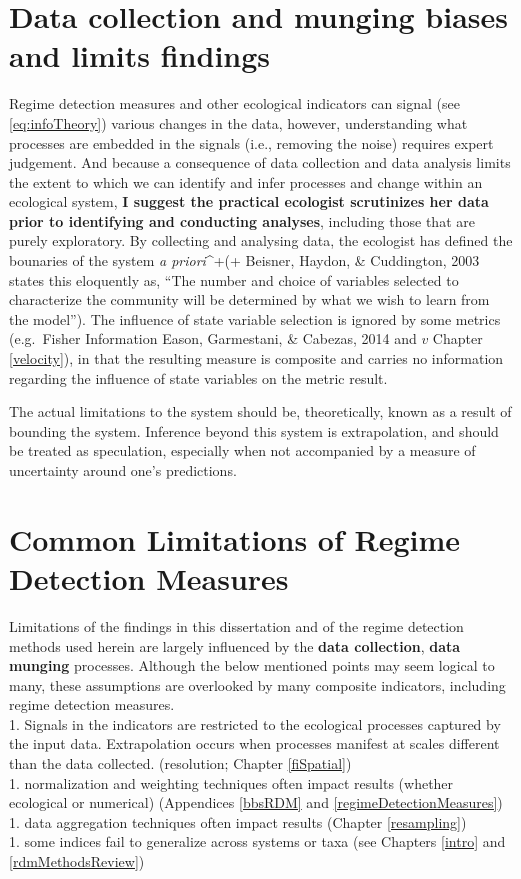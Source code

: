 \documentclass[12pt,twoside,openany]{reedthesis}
\begin{document}
\section{Data collection and munging biases and limits
findings}\label{data-collection-and-munging-biases-and-limits-findings}

Regime detection measures and other ecological indicators can signal
(see \eqref{eq:infoTheory}) various changes in the data, however,
understanding what processes are embedded in the signals (i.e., removing
the noise) requires expert judgement. And because a consequence of data
collection and data analysis limits the extent to which we can identify
and infer processes and change within an ecological system, \textbf{I
suggest the practical ecologist scrutinizes her data prior to
identifying and conducting analyses}, including those that are purely
exploratory. By collecting and analysing data, the ecologist has defined
the bounaries of the system \emph{a priori}\^{}+(+ Beisner, Haydon, \&
Cuddington, 2003 states this eloquently as, ``The number and choice of
variables selected to characterize the community will be determined by
what we wish to learn from the model''). The influence of state variable
selection is ignored by some metrics (e.g.~Fisher Information Eason,
Garmestani, \& Cabezas, 2014 and \(v\) Chapter \ref{velocity}), in that
the resulting measure is composite and carries no information regarding
the influence of state variables on the metric result.

The actual limitations to the system should be, theoretically, known as
a result of bounding the system. Inference beyond this system is
extrapolation, and should be treated as speculation, especially when not
accompanied by a measure of uncertainty around one's predictions.

\section{Common Limitations of Regime Detection
Measures}\label{common-limitations-of-regime-detection-measures}

Limitations of the findings in this dissertation and of the regime
detection methods used herein are largely influenced by the \textbf{data
collection}, \textbf{data munging} processes. Although the below
mentioned points may seem logical to many, these assumptions are
overlooked by many composite indicators, including regime detection
measures.\\
1. Signals in the indicators are restricted to the ecological processes
captured by the input data. Extrapolation occurs when processes manifest
at scales different than the data collected. (resolution; Chapter
\ref{fiSpatial})\\
1. normalization and weighting techniques often impact results (whether
ecological or numerical) (Appendices \ref{bbsRDM} and
\ref{regimeDetectionMeasures})\\
1. data aggregation techniques often impact results (Chapter
\ref{resampling})\\
1. some indices fail to generalize across systems or taxa (see Chapters
\ref{intro} and \ref{rdmMethodsReview})
\end{document}
